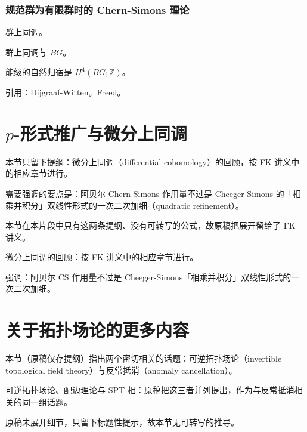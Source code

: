 \subsubsection{规范群为有限群时的 Chern-Simons 理论} %

群上同调。

群上同调与 $BG$。

能级的自然归宿是 $H^4(BG;\mathbb{Z})$。

引用：Dijgraaf-Witten。Freed。

\section{$p$-形式推广与微分上同调} %

\begin{keytakeaways}
  \item 本节只留下提纲：微分上同调（differential cohomology）的回顾，按 FK 讲义中的相应章节进行。
  \item 需要强调的要点是：阿贝尔 Chern-Simons 作用量不过是 Cheeger-Simons 的「相乘并积分」双线性形式的一次二次加细（quadratic refinement）。
  \item 本节在本片段中只有这两条提纲、没有可转写的公式，故原稿把展开留给了 FK 讲义。
\end{keytakeaways}

微分上同调的回顾：按 FK 讲义中的相应章节进行。

强调：阿贝尔 CS 作用量不过是 Cheeger-Simons「相乘并积分」双线性形式的一次二次加细。

\section{关于拓扑场论的更多内容} %

\begin{keytakeaways}
  \item 本节（原稿仅存提纲）指出两个密切相关的话题：可逆拓扑场论（invertible topological field theory）与反常抵消（anomaly cancellation）。
  \item 可逆拓扑场论、配边理论与 SPT 相：原稿把这三者并列提出，作为与反常抵消相关的同一组话题。
  \item 原稿未展开细节，只留下标题性提示，故本节无可转写的推导。
\end{keytakeaways}

